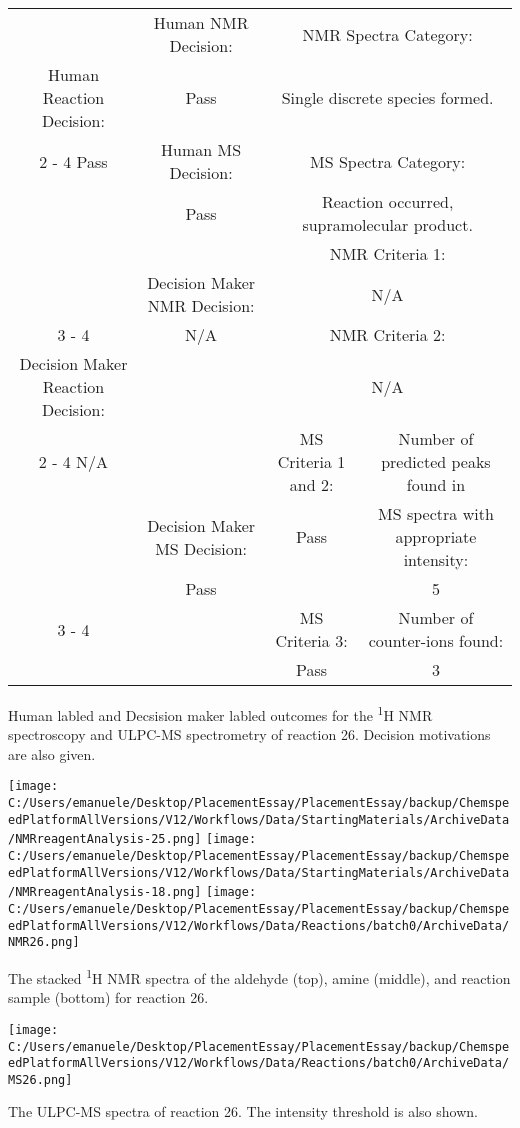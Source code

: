 \documentclass{article}%
\begin{document}
\begin{Decision Table}[H]%
\begin{tabular}{|c|c|c|c|}%
\hline%
&Human NMR Decision:&\multicolumn{2}{|c|}{NMR Spectra Category:}\\%
Human Reaction Decision:&Pass&\multicolumn{2}{|c|}{Single discrete species formed.}\\%
\cline{2%
-%
4}%
Pass&Human MS Decision:&\multicolumn{2}{|c|}{MS Spectra Category:}\\%
&Pass&\multicolumn{2}{|c|}{Reaction occurred, supramolecular product.}\\%
\hline%
&&\multicolumn{2}{|c|}{NMR Criteria 1:}\\%
&Decision Maker NMR Decision:&\multicolumn{2}{|c|}{N/A}\\%
\cline{3%
-%
4}%
&N/A&\multicolumn{2}{|c|}{NMR Criteria 2:}\\%
Decision Maker Reaction Decision:&&\multicolumn{2}{|c|}{N/A}\\%
\cline{2%
-%
4}%
N/A&&MS Criteria 1 and 2:&Number of predicted peaks found in\\%
&Decision Maker MS Decision:&Pass&MS spectra with appropriate intensity:\\%
&Pass&&5\\%
\cline{3%
-%
4}%
&&MS Criteria 3:&Number of counter{-}ions found:\\%
&&Pass&3\\%
\hline%
\end{tabular}%
\caption{Human labled and Decsision maker labled outcomes for the \textsuperscript{1}H NMR spectroscopy and ULPC-MS spectrometry of reaction 26. Decision motivations are also given.}%
\end{Decision Table}%
\begin{NMR Spectra}[H]%
\begin{center}%
\texttt{[image: C:/Users/emanuele/Desktop/PlacementEssay/PlacementEssay/backup/ChemspeedPlatformAllVersions/V12/Workflows/Data/StartingMaterials/ArchiveData/NMRreagentAnalysis-25.png]}\hfill%
\texttt{[image: C:/Users/emanuele/Desktop/PlacementEssay/PlacementEssay/backup/ChemspeedPlatformAllVersions/V12/Workflows/Data/StartingMaterials/ArchiveData/NMRreagentAnalysis-18.png]}\hfill%
\texttt{[image: C:/Users/emanuele/Desktop/PlacementEssay/PlacementEssay/backup/ChemspeedPlatformAllVersions/V12/Workflows/Data/Reactions/batch0/ArchiveData/NMR26.png]}\hfill%
\end{center}%
\caption{The stacked \textsuperscript{1}H NMR spectra of the aldehyde (top), amine (middle), and reaction sample (bottom) for reaction 26.}%
\end{NMR Spectra}%
\begin{MS Spectra}[H]%
\begin{center}%
\texttt{[image: C:/Users/emanuele/Desktop/PlacementEssay/PlacementEssay/backup/ChemspeedPlatformAllVersions/V12/Workflows/Data/Reactions/batch0/ArchiveData/MS26.png]}\hfill%
\end{center}%
\caption{The ULPC-MS spectra of reaction 26. The intensity threshold is also shown.}%
\end{MS Spectra}%
\end{document}
